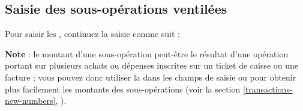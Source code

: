 \subsection{Saisie des sous-opérations ventilées\label{transactions-breakdown-slave}}

Pour saisir les , continuez la saisie comme suit :

\textbf{Note} : le montant d'une sous-opération peut-être le résultat d'une opération portant sur plusieurs achats ou dépenses inscrites sur un ticket de caisse ou une facture ; vous pouvez donc utiliser la  dans les champs de saisie  ou  pour obtenir plus facilement les montants des sous-opérations (voir la section \vref{transactions-new-numbers}, ).

